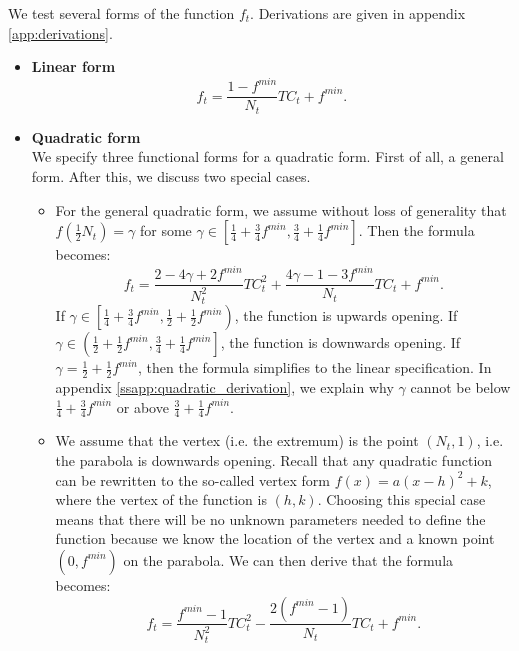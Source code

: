 \documentclass[12pt]{article}
\begin{document}
	We test several forms of the function $f_t$. Derivations are given in appendix \ref{app:derivations}.
	\begin{itemize}
		\item \textbf{Linear form}
		    \begin{equation} \label{eq:linear_functional_form}
		        f_t = \frac{1-f^{min}}{N_t}TC_t + f^{min}.
		    \end{equation}
    		
    	\item \textbf{Quadratic form}\\
    	We specify three functional forms for a quadratic form. First of all, a general form. After this, we discuss two special cases.
    	    \begin{itemize}
    	        \item For the general quadratic form, we assume without loss of generality that $f\left(\frac{1}{2}N_t\right) = \gamma$ for some $\gamma \in \left[\frac{1}{4} + \frac{3}{4}f^{min}, \frac{3}{4} + \frac{1}{4} f^{min}\right]$. Then the formula becomes:
    	            \begin{equation} \label{eq:quadratic_functional_form}
    	                f_t = \frac{2 - 4\gamma + 2f^{min}}{N_t^2}TC_t^2 + \frac{4\gamma - 1 - 3f^{min}}{N_t}TC_t + f^{min}.
    	            \end{equation}
		        If $\gamma \in \left[\frac{1}{4} + \frac{3}{4}f^{min}, \frac{1}{2} + \frac{1}{2}f^{min}\right)$, the function is upwards opening. If $\gamma \in \left(\frac{1}{2} + \frac{1}{2}f^{min}, \frac{3}{4} + \frac{1}{4} f^{min}\right]$, the function is downwards opening. If $\gamma = \frac{1}{2} + \frac{1}{2}f^{min}$, then the formula simplifies to the linear specification. In appendix \ref{ssapp:quadratic_derivation}, we explain why $\gamma$ cannot be below $\frac{1}{4} + \frac{3}{4}f^{min}$ or above $\frac{3}{4} + \frac{1}{4} f^{min}$.
		        
		        \item  We assume that the vertex (i.e. the extremum) is the point $(N_t, 1)$, i.e. the parabola is downwards opening. Recall that any quadratic function can be rewritten to the so-called vertex form $f(x) = a(x - h)^2 + k$, where the vertex of the function is $(h, k)$. Choosing this special case means that there will be no unknown parameters needed to define the function because we know the location of the vertex and a known point $(0, f^{min})$ on the parabola. We can then derive that the formula becomes:
		            \begin{equation} \label{eq:quadratic_downwards_functional_form}
		                f_t = \frac{f^{min}-1}{N_t^2}TC_t^2 - \frac{2(f^{min}-1)}{N_t}TC_t + f^{min}.
		            \end{equation}
		        

\end{itemize}
\end{itemize}
\end{document}
